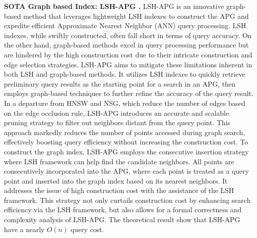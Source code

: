 \textbf{SOTA Graph based Index: LSH-APG \cite{DBLP:journals/pvldb/ZhaoTHZZ23}.} 
LSH-APG is an innovative graph-based method that leverages lightweight LSH indexes to construct the APG and expedite efficient Approximate Nearest Neighbor (ANN) query processing. 
LSH indexes, while swiftly constructed, often fall short in terms of query accuracy. On the other hand, graph-based methods excel in query processing performance but are hindered by the high construction cost due to their intricate construction and edge selection strategies. 
LSH-APG aims to mitigate these limitations inherent in both LSH and graph-based methods. It utilizes LSH indexes to quickly retrieve preliminary query results as the starting point for a search in an APG, then employs graph-based techniques to further refine the accuracy of the query result. 
In a departure from HNSW and NSG, which reduce the number of edges based on the edge occlusion rule, LSH-APG introduces an accurate and scalable pruning strategy to filter out neighbors distant from the query point. This approach markedly reduces the number of points accessed during graph search, effectively boosting query efficiency without increasing the construction cost. 
To construct the graph index, LSH-APG employs the consecutive insertion strategy where LSH framework can help find the candidate neighbors. All points are consecutively incorporated into the APG, where each point is treated as a query point and inserted into the graph index based on its nearest neighbors. It addresses the issue of high construction cost with the assistance of the LSH framework.
This strategy not only curtails construction cost by enhancing search efficiency via the LSH framework, but also allows for a formal correctness and complexity analysis of LSH-APG. The theoretical result show that LSH-APG have a nearly $O(n)$ query cost. 


